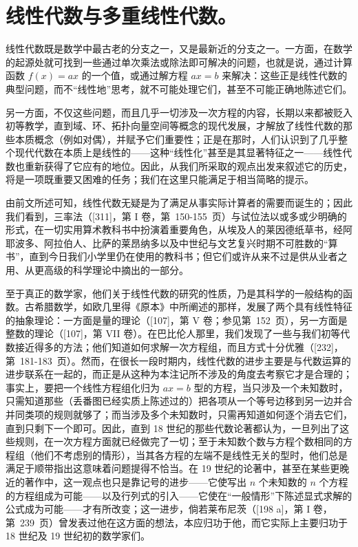 \chapter{线性代数与多重线性代数。}

线性代数既是数学中最古老的分支之一，又是最新近的分支之一。一方面，在数学的起源处就可找到一些通过单次乘法或除法即可解决的问题，也就是说，通过计算函数 \(f(x) = ax\) 的一个值，或通过解方程 \(ax = b\) 来解决：这些正是线性代数的典型问题，而不“线性地”思考，就不可能处理它们，甚至不可能正确地陈述它们。

另一方面，不仅这些问题，而且几乎一切涉及一次方程的内容，长期以来都被贬入初等教学，直到域、环、拓扑向量空间等概念的现代发展，才解放了线性代数的那些本质概念（例如对偶），并赋予它们重要性；正是在那时，人们认识到了几乎整个现代代数在本质上是线性的——这种“线性化”甚至是其显著特征之一——线性代数也重新获得了它应有的地位。因此，从我们所采取的观点出发来叙述它的历史，将是一项既重要又困难的任务；我们在这里只能满足于相当简略的提示。

由前文所述可知，线性代数无疑是为了满足从事实际计算者的需要而诞生的；因此我们看到，三率法（{[}311{]}，第 I 卷，第~150-155~页）与试位法以或多或少明确的形式，在一切实用算术教科书中扮演着重要角色，从埃及人的莱因德纸草书，经阿耶波多、阿拉伯人、比萨的莱昂纳多以及中世纪与文艺复兴时期不可胜数的“算书”，直到今日我们小学里仍在使用的教科书；但它们或许从来不过是供从业者之用、从更高级的科学理论中摘出的一部分。

至于真正的数学家，他们关于线性代数的研究的性质，乃是其科学的一般结构的函数。古希腊数学，如欧几里得《原本》中所阐述的那样，发展了两个具有线性特征的抽象理论：一方面是量的理论（{[}107{]}，第 V 卷；参见第~152~页），另一方面是整数的理论（{[}107{]}，第 VII 卷）。在巴比伦人那里，我们发现了一些与我们初等代数接近得多的方法；他们知道如何求解一次方程组，而且方式十分优雅（{[}232{]}，第~181-183~页）。然而，在很长一段时期内，线性代数的进步主要是与代数运算的进步联系在一起的，而正是从这种为本注记所不涉及的角度去考察它才是合理的；事实上，要把一个线性方程组化归为 \(ax = b\) 型的方程，当只涉及一个未知数时，只需知道那些（丢番图已经实质上陈述过的）把各项从一个等号边移到另一边并合并同类项的规则就够了；而当涉及多个未知数时，只需再知道如何逐个消去它们，直到只剩下一个即可。因此，直到 18 世纪的那些代数论著都认为，一旦列出了这些规则，在一次方程方面就已经做完了一切；至于未知数个数与方程个数相同的方程组（他们不考虑别的情形），当其各方程的左端不是线性无关的型时，他们总是满足于顺带指出这意味着问题提得不恰当。在 19 世纪的论著中，甚至在某些更晚近的著作中，这一观点也只是靠记号的进步——它使写出 \(n\) 个未知数的 \(n\) 个方程的方程组成为可能——以及行列式的引入——它使在“一般情形”下陈述显式求解的公式成为可能——才有所改变；这一进步，倘若莱布尼茨（{[}198 a{]}，第 I 卷，第~239~页）曾发表过他在这方面的想法，本应归功于他，而它实际上主要归功于 18 世纪及 19 世纪初的数学家们。

